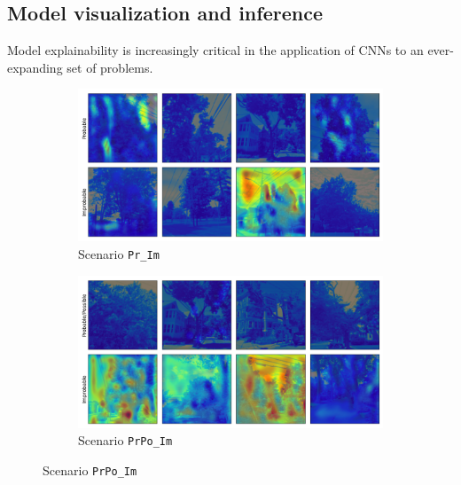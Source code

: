\documentclass[Journal,letterpaper, SingleSpace, InsideFigs]{ascelike-new}
\begin{document}
\subsection{Model visualization and inference}
Model explainability is increasingly critical in the application of CNNs to an ever-expanding set of problems.

\begin{figure}[ht]
    \centering

    \begin{subfigure}[t]{.45\linewidth}
    \centering
    \includegraphics[width=\linewidth]{opt-gradcam-Pr_Im-128-px-4-images.png}
    \caption{Scenario \texttt{Pr\_Im}}
    \label{prpo_im_cm}
    \end{subfigure}%
    \begin{subfigure}[t]{.45\linewidth}
    \centering
    \includegraphics[width=\linewidth]{opt-gradcam-PrPo_Im-128-px-4-images.png}
    \caption{Scenario \texttt{PrPo\_Im}}
    \label{prpo_im_cm}
    \end{subfigure}%
    

\end{figure}
\end{document}

